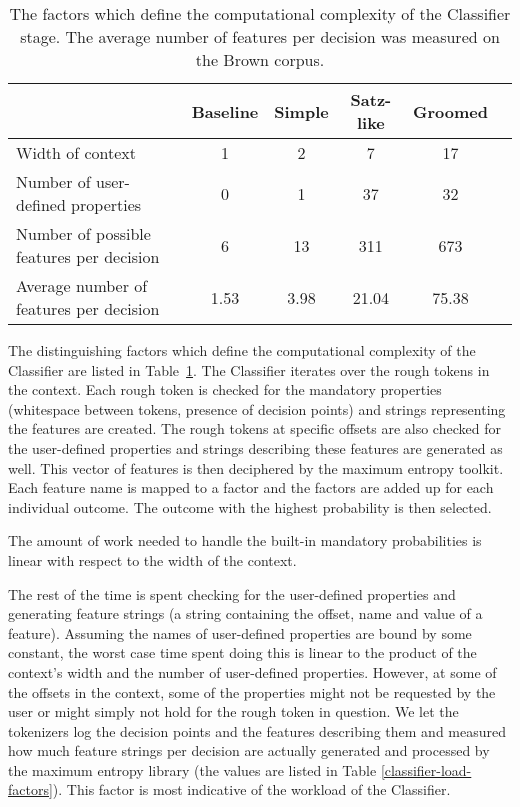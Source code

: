 \begin{table}
  \begin{center}
    \begin{tabular}{ | l | c | c | c | c | c | }
      \hline
      & Baseline & Simple & Satz-like & Groomed \\ \hline
      Width of context & 1 & 2 & 7 & 17 \\ \hline
      Number of user-defined properties & 0 & 1 & 37 & 32 \\ \hline
      Number of possible features per decision & 6 & 13 & 311 & 673 \\ \hline
      Average number of features per decision & 1.53 & 3.98 & 21.04 & 75.38 \\
      \hline
    \end{tabular}
  \end{center}
  \caption[Computational complexity of the Classifier stage]
    {The factors which define the computational complexity of the Classifier
    stage. The average number of features per decision was measured on the
    Brown corpus.}
  \label{tbl:classifier-load-factors}
\end{table}

The distinguishing factors which define the computational complexity of the
Classifier are listed in Table~\ref{tbl:classifier-load-factors}. The
Classifier iterates over the rough tokens in the context. Each rough token is
checked for the mandatory properties (whitespace between tokens, presence of
decision points) and strings representing the features are created. The rough
tokens at specific offsets are also checked for the user-defined properties and
strings describing these features are generated as well. This vector of
features is then deciphered by the maximum entropy toolkit. Each feature name
is mapped to a factor and the factors are added up for each individual outcome.
The outcome with the highest probability is then selected.

The amount of work needed to handle the built-in mandatory probabilities is
linear with respect to the width of the context.

The rest of the time is spent checking for the user-defined properties and
generating feature strings (a string containing the offset, name and value of a
feature). Assuming the names of user-defined properties are bound by some
constant, the worst case time spent doing this is linear to the product of the
context's width and the number of user-defined properties. However, at some of
the offsets in the context, some of the properties might not be requested by
the user or might simply not hold for the rough token in question. We let the
tokenizers log the decision points and the features describing them and
measured how much feature strings per decision are actually generated and
processed by the maximum entropy library (the values are listed in Table
\ref{classifier-load-factors}). This factor is most indicative of the
workload of the Classifier.

